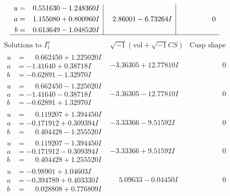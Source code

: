 \documentclass[1p]{elsarticle_modified}
\theoremstyle{definition}
\newcommand{\I}{\sqrt{-1}}
\begin{document}
$$\begin{array}{c|c|c}
\begin{aligned}
u &= \phantom{-}0.551630 - 1.248360 I \\
a &= \phantom{-}1.155080 + 0.800960 I \\
b &= \phantom{-}0.613649 - 1.048520 I\end{aligned}
 & \phantom{-}2.86001 - 6.73264 I & \phantom{-0.000000 } 0\\
 \hline 
 \end{array}$$\newpage$$\begin{array}{c|c|c}  
\text{Solutions to }I^u_{1}& \I (\text{vol} + \sqrt{-1}CS) & \text{Cusp shape}\\
 \hline 
\begin{aligned}
u &= \phantom{-}0.662450 + 1.225020 I \\
a &= -1.41640 + 0.38718 I \\
b &= -0.62891 - 1.32970 I\end{aligned}
 & -3.36305 + 12.77810 I & \phantom{-0.000000 } 0 \\ \hline\begin{aligned}
u &= \phantom{-}0.662450 - 1.225020 I \\
a &= -1.41640 - 0.38718 I \\
b &= -0.62891 + 1.32970 I\end{aligned}
 & -3.36305 - 12.77810 I & \phantom{-0.000000 } 0 \\ \hline\begin{aligned}
u &= \phantom{-}0.119207 + 1.394450 I \\
a &= -0.171912 + 0.309394 I \\
b &= \phantom{-}0.404428 - 1.255520 I\end{aligned}
 & -3.33366 - 9.51592 I & \phantom{-0.000000 } 0 \\ \hline\begin{aligned}
u &= \phantom{-}0.119207 - 1.394450 I \\
a &= -0.171912 - 0.309394 I \\
b &= \phantom{-}0.404428 + 1.255520 I\end{aligned}
 & -3.33366 + 9.51592 I & \phantom{-0.000000 } 0 \\ \hline\begin{aligned}
u &= -0.98901 + 1.04603 I \\
a &= -0.394789 + 0.403330 I \\
b &= \phantom{-}0.028808 + 0.776809 I\end{aligned}
 & \phantom{-}5.09633 - 0.04450 I & \phantom{-0.000000 } 0 \\ \hline\begin{aligned}

\end{aligned}
\end{array}$$
\end{document}
